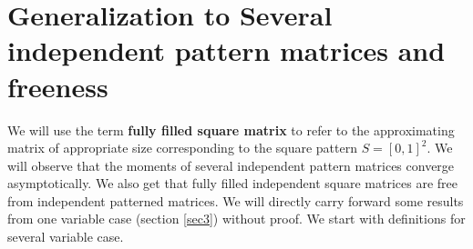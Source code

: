 \documentclass[12pt]{amsart}
\theoremstyle{definition}
\theoremstyle{remark}
\begin{document}
    









\section{Generalization to Several independent pattern matrices and freeness} \label{freeness} 

 We will use the term \textbf{fully filled square matrix} to refer to the approximating matrix of appropriate size corresponding to the square pattern $S=[0,1]^2$. We will observe that the moments of several independent pattern matrices converge asymptotically. We also get that fully filled independent square matrices are free from independent patterned matrices. We will directly carry forward some results from one variable case (section \ref{sec3}) without proof. We start with definitions for several variable case. \par
\end{document}
